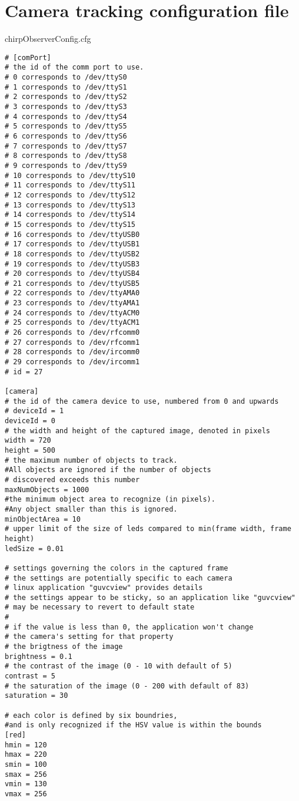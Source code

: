 \section{Camera tracking configuration file}
\label{app:opencvcfg}
chirpObserverConfig.cfg
\begin{lstlisting}
# [comPort]
# the id of the comm port to use. 
# 0 corresponds to /dev/ttyS0 
# 1 corresponds to /dev/ttyS1
# 2 corresponds to /dev/ttyS2
# 3 corresponds to /dev/ttyS3
# 4 corresponds to /dev/ttyS4
# 5 corresponds to /dev/ttyS5
# 6 corresponds to /dev/ttyS6
# 7 corresponds to /dev/ttyS7
# 8 corresponds to /dev/ttyS8
# 9 corresponds to /dev/ttyS9
# 10 corresponds to /dev/ttyS10
# 11 corresponds to /dev/ttyS11
# 12 corresponds to /dev/ttyS12
# 13 corresponds to /dev/ttyS13
# 14 corresponds to /dev/ttyS14
# 15 corresponds to /dev/ttyS15
# 16 corresponds to /dev/ttyUSB0
# 17 corresponds to /dev/ttyUSB1
# 18 corresponds to /dev/ttyUSB2
# 19 corresponds to /dev/ttyUSB3
# 20 corresponds to /dev/ttyUSB4
# 21 corresponds to /dev/ttyUSB5
# 22 corresponds to /dev/ttyAMA0
# 23 corresponds to /dev/ttyAMA1
# 24 corresponds to /dev/ttyACM0
# 25 corresponds to /dev/ttyACM1
# 26 corresponds to /dev/rfcomm0
# 27 corresponds to /dev/rfcomm1
# 28 corresponds to /dev/ircomm0
# 29 corresponds to /dev/ircomm1
# id = 27

[camera]
# the id of the camera device to use, numbered from 0 and upwards
# deviceId = 1
deviceId = 0
# the width and height of the captured image, denoted in pixels
width = 720	
height = 500
# the maximum number of objects to track. 
#All objects are ignored if the number of objects
# discovered exceeds this number
maxNumObjects = 1000
#the minimum object area to recognize (in pixels). 
#Any object smaller than this is ignored.
minObjectArea = 10
# upper limit of the size of leds compared to min(frame width, frame height)
ledSize = 0.01

# settings governing the colors in the captured frame
# the settings are potentially specific to each camera
# linux application "guvcview" provides details
# the settings appear to be sticky, so an application like "guvcview"
# may be necessary to revert to default state
#
# if the value is less than 0, the application won't change
# the camera's setting for that property
# the brigtness of the image
brightness = 0.1
# the contrast of the image (0 - 10 with default of 5)
contrast = 5
# the saturation of the image (0 - 200 with default of 83)
saturation = 30

# each color is defined by six boundries,
#and is only recognized if the HSV value is within the bounds
[red]
hmin = 120
hmax = 220
smin = 100
smax = 256
vmin = 130
vmax = 256


\end{lstlisting}
